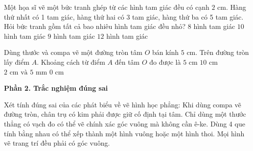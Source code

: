 \begin{ex} %
Một họa sĩ vẽ một bức tranh ghép từ các hình tam giác đều có cạnh $2\text{ cm}$. Hàng thứ nhất có 1 tam giác, hàng thứ hai có 3 tam giác, hàng thứ ba có 5 tam giác. Hỏi bức tranh gồm tất cả bao nhiêu hình tam giác đều nhỏ?
\choice
{$8$ hình tam giác}
{$10$ hình tam giác}
{\True $9$ hình tam giác}
{$12$ hình tam giác}
\end{ex}

\begin{ex} %
Dùng thước và compa vẽ một đường tròn tâm $O$ bán kính $5\text{ cm}$. Trên đường tròn lấy điểm $A$. Khoảng cách từ điểm $A$ đến tâm $O$ đo được là
\choice
{\True $5\text{ cm}$}
{$10\text{ cm}$}
{$2\text{ cm và } 5\text{ mm}$}
{$0\text{ cm}$}
\end{ex}

\textbf{Phần 2. Trắc nghiệm đúng sai}

\begin{ex} %
Xét tính đúng sai của các phát biểu về vẽ hình học phẳng:
\choiceTF
{\True Khi dùng compa vẽ đường tròn, chân trụ có kim phải được giữ cố định tại tâm.}
{Chỉ dùng một thước thẳng có vạch đo có thể vẽ chính xác góc vuông mà không cần ê-ke.}
{\True Dùng 4 que tính bằng nhau có thể xếp thành một hình vuông hoặc một hình thoi.}
{Mọi hình vẽ trang trí đều phải có góc vuông.}
\end{ex}

